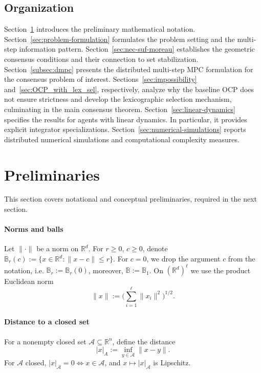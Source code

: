 \documentclass[12pt,draftcls,onecolumn]{IEEEtran}
\def\A{\mathcal{A}}
\begin{document}
\subsection{Organization}
Section~\ref{sec:preliminaries} introduces the preliminary mathematical notation.
Section~\ref{sec:problem-formulation} formulates the problem setting and the multi-step information pattern.
Section~\ref{sec:nec-suf-moreau} establishes the geometric consensus conditions and their connection to set stabilization.
Section~\ref{subsec:dmpc} presents the distributed multi-step MPC formulation for the consensus problem of interest.
Sections~\ref{sec:impossibility} and~\ref{sec:OCP_with_lex_sel}, respectively, analyze why the baseline OCP does not ensure strictness and develop the lexicographic selection mechanism, culminating in the main consensus theorem.
Section~\ref{sec:linear-dynamics} specifies the results for agents with linear dynamics. In particular, it provides explicit integrator specializations.
Section~\ref{sec:numerical-simulations} reports distributed numerical simulations and computational complexity measures.

\section{Preliminaries}
\label{sec:preliminaries}
This section covers notational and conceptual preliminaries, required in the next section.

\paragraph{Norms and balls}
Let $\|\cdot\|$ be a norm on $\mathbb{R}^d$. 
For $r\ge 0$, $c \geq 0$, denote $\mathbb{B}_r(c):=\{x\in\mathbb{R}^d:\|x - c \|\le r\}$.
For $c = 0$, we drop the argument $c$ from the notation, i.e. $\mathbb{B}_r := \mathbb{B}_r(0)$, moreover, $\mathbb{B}:=\mathbb{B}_1$. 
On $(\mathbb{R}^d)^\ell$ we use the product Euclidean norm
\[
\|x\| := \Big(\sum_{i=1}^{\ell}\|x_i\|^2\Big)^{1/2}.
\]

\paragraph{Distance to a closed set}
For a nonempty closed set $\A \subseteq \mathbb{R}^n$, define the distance
\[
|x|_A := \inf_{y\in \A}\|x-y\|.
\]
For $\A$ closed, $|x|_\A=0\iff x\in \A$, and $x\mapsto |x|_\A$ is Lipschitz.
\end{document}
